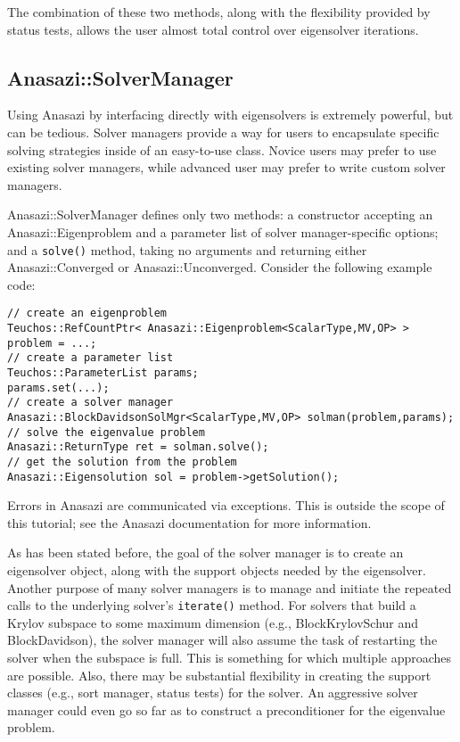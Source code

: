 The combination of these two methods, along with the flexibility provided by status tests,
allows the user almost total control over eigensolver iterations.


\subsection{Anasazi::SolverManager}
\label{sec:anasazi:solvermanager}

Using Anasazi by interfacing directly with eigensolvers is extremely powerful, but can be
tedious. Solver managers provide a way for users to encapsulate specific solving
strategies inside of an easy-to-use class. Novice users may prefer to use existing solver
managers, while advanced user may prefer to write custom solver managers.

Anasazi::SolverManager defines only two methods: a constructor accepting an
Anasazi::Eigenproblem and a parameter list of solver manager-specific options; and a
\verb!solve()! method, taking no arguments and returning 
either Anasazi::Converged or Anasazi::Unconverged.
Consider the following example code:
\begin{verbatim}
// create an eigenproblem
Teuchos::RefCountPtr< Anasazi::Eigenproblem<ScalarType,MV,OP> > problem = ...;
// create a parameter list
Teuchos::ParameterList params;
params.set(...);
// create a solver manager
Anasazi::BlockDavidsonSolMgr<ScalarType,MV,OP> solman(problem,params);
// solve the eigenvalue problem
Anasazi::ReturnType ret = solman.solve();
// get the solution from the problem
Anasazi::Eigensolution sol = problem->getSolution();
\end{verbatim}

\begin{remark}
  Errors in Anasazi are communicated via exceptions. This is outside the scope of this
  tutorial; see the Anasazi documentation for more information.
\end{remark}

As has been stated before, the goal of the solver manager is to create an eigensolver
object, along with the support objects needed by the eigensolver. Another purpose of many
solver managers is to manage and initiate the repeated calls to the underlying solver's
\verb!iterate()! method. For solvers that build a Krylov subspace to some maximum
dimension (e.g., BlockKrylovSchur and BlockDavidson), the solver manager will also assume
the task of restarting the solver when the subspace is full. This is something for which
multiple approaches are possible. Also, there may be substantial flexibility in creating
the support classes (e.g., sort manager, status tests) for the solver. An aggressive
solver manager could even go so far as to construct a preconditioner for the eigenvalue
problem. 

